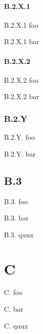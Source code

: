 \documentclass[11pt]{article}
\begin{document}
    \paragraph{B.2.X.1}

    B.2.X.1 foo

    B.2.X.1 bar

    \paragraph{B.2.X.2}

    B.2.X.2 foo

    B.2.X.2 bar

    \subsubsection{B.2.Y}

    B.2.Y. foo

    B.2.Y. bar

    \subsection{B.3}

    B.3. foo

    B.3. bar

    B.3. quux

    \section{C}

    C. foo

    C. bar

    C. quux
\end{document}
